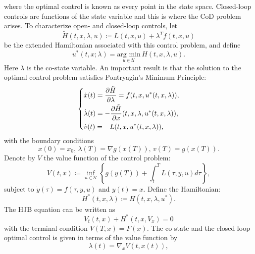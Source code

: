 \documentclass[12pt]{article}
\theoremstyle{definition}
\newcommand{\bx}{{x}}
\newcommand{\be}{\begin{equation}}
\newcommand{\ee}{\end{equation}}
\newcommand{\del}{\partial}
\begin{document}
where the optimal control is known as every point in the state space. Closed-loop controls are functions of the state variable
and this is where the CoD problem arises.
%
To characterize open- and closed-loop controls, let 
\begin{equation}
\label{eq: Hamiltonian}
\tilde{ H} (t, x, \lambda, u) \coloneqq L (t, x, u) +  \lambda^T  f (t, x, u) 
\end{equation}
be the extended Hamiltonian associated with this control problem, and define
\begin{equation} 
\label{eq: optimal control as Hamiltonian minimizer}
 u^* (t, x; \lambda) = \underset{u \in \mathcal U}{\text{arg min}} \, H (t, x,  \lambda, u) .
\end{equation}
Here $\lambda$ is the co-state variable.  An important result is that the solution to the optimal control problem satisfies
Pontryagin's Minimum Principle:
\begin{equation}
\label{eq:BVP}
\begin{dcases*}
\dot{x} (t) = \frac{\del \tilde{H}}{\del \lambda} = f (t, x, u^* (t, x, \lambda)) , \\
\dot{\lambda} (t) = - \frac{\del \tilde{H}}{\del x} (t, x, \lambda, u^* (t, x, \lambda)) , \\
\dot v (t) = - L (t, x, u^* (t, x, \lambda)) ,
\end{dcases*}
\end{equation}
with the boundary conditions
\begin{equation}
\label{eq:BVP_BC}
x (0) = x_0 , \,
\lambda (T) = \nabla g(x (T)) , \,
v (T) = g (x (T)).
\end{equation}
%
Denote by $V$ the value function of the control problem:
\begin{equation}
\label{eq: value function}
V (t, x) \coloneqq \inf_{u \in \mathcal U} \left \{ g (y (T)) + \displaystyle \int_t^{T} L (\tau, y, u) d\tau \right \} ,
\end{equation}
subject to $\dot {y} (\tau) = f (\tau, y, u)$ and $y (t) = x$. 
Define the Hamiltonian:
\be
 H^* (t, x, \lambda) \coloneqq H (t, x, \lambda, u^*).
 \ee
 The HJB equation can be written as
\begin{equation}
\label{eq: HJB}
V_t (t, x) + H^* \left( t, x, V_{x} \right) = 0 
\end{equation}
with the terminal condition $V (T, x) = F (x)$.
The co-state and the closed-loop optimal control is given in terms of the value function by
\begin{equation}
\label{eq: costate as gradient}
\lambda (t) = \nabla_{\bx} V (t, x(t)),
\end{equation}
\end{document}
